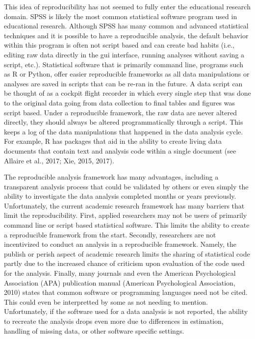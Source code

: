 \documentclass[english,man]{apa6}
\theoremstyle{definition}
\theoremstyle{definition}
\theoremstyle{remark}
\begin{document}
This idea of reproducibility has not seemed to fully enter the
educational research domain. SPSS is likely the most common statistical
software program used in educational research. Although SPSS has many
common and advanced statistical techniques and it is possible to have a
reproducible analysis, the default behavior within this program is often
not script based and can create bad habits (i.e., editing raw data
directly in the gui interface, running analyses without saving a script,
etc.). Statistical software that is primarily command line, programs
such as R or Python, offer easier reproducible frameworks as all data
manipulations or analyses are saved in scripts that can be re-ran in the
future. A data script can be thought of as a cockpit flight recorder in
which every single step that was done to the original data going from
data collection to final tables and figures was script based. Under a
reproducible framework, the raw data are never altered directly, they
should always be altered programmatically through a script. This keeps a
log of the data manipulations that happened in the data analysis cycle.
For example, R has packages that aid in the ability to create living
data documents that contain text and analysis code within a single
document (see Allaire et al., 2017; Xie, 2015, 2017).

The reproducible analysis framework has many advantages, including a
transparent analysis process that could be validated by others or even
simply the ability to investigate the data analysis completed months or
years previously. Unfortunately, the current academic research framework
has many barriers that limit the reproducibility. First, applied
researchers may not be users of primarily command line or script based
statistical software. This limits the ability to create a reproducible
framework from the start. Secondly, researchers are not incentivized to
conduct an analysis in a reproducible framework. Namely, the publish or
perish aspect of academic research limits the sharing of statistical
code partly due to the increased chance of criticism upon evaluation of
the code used for the analysis. Finally, many journals and even the
American Psychological Association (APA) publication manual (American
Psychological Association, 2010) states that common software or
programming languages need not be cited. This could even be interpretted
by some as not needing to mention. Unfortunately, if the software used
for a data analysis is not reported, the ability to recreate the
analysis drops even more due to differences in estimation, handling of
missing data, or other software specific settings.
\end{document}

